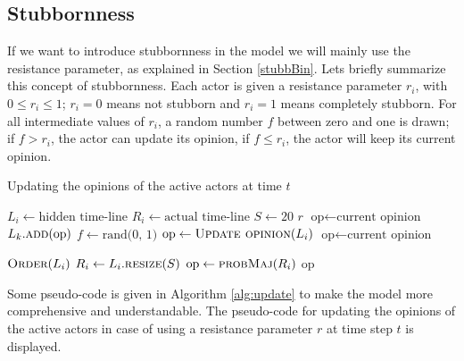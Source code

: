 \documentclass[11 pt , letterpaper , twoside , openright]{book}
\begin{document}
\subsection{Stubbornness}

If we want to introduce stubbornness in the model we will mainly use the resistance parameter, as explained in Section \ref{stubbBin}. Lets briefly summarize this concept of stubbornness. Each actor is given a resistance parameter $r_i$, with $0 \leqslant r_i \leqslant 1$; $r_i = 0$ means not stubborn and $r_i = 1$ means completely stubborn. For all intermediate values of $r_i$, a random number $f$ between zero and one is drawn; if $f > r_i$, the actor can update its opinion, if $f \leqslant r_i$, the actor will keep its current opinion. 

\begin{algorithm}
\caption{Updating the opinions of the active actors at time $t$}
\label{alg:update}
\begin{algorithmic}[1]
	\State \(L_i \leftarrow \text{hidden time-line}\)
	\State \(R_i \leftarrow \text{actual time-line}\)
	\State \(S \leftarrow 20\) 
	\State \(r\) 
		\State \(\text{op} \leftarrow \text{current opinion}\)
		 
			\State \(L_k.\textsc{add}\text{(op)}\)
		\EndFor
		\State \(f \leftarrow \text{rand(0, 1)}\) 
			\State \(\text{op} \leftarrow \Call{Update opinion}{L_i}\) 
		\Else
			\State \(\text{op} \leftarrow \text{current opinion}\) 
		\EndIf
	\EndFor
	
		\State \(\textsc{Order}(L_i)\) 
			\State \(R_i \leftarrow L_i.\textsc{resize}(S)\) 
		\EndIf
		\State \(\text{op} \leftarrow \textsc{probMaj}(R_i)\) 
	\State \Return op 
	\EndFunction
\end{algorithmic}
\end{algorithm}
\noindent
Some pseudo-code is given in Algorithm \ref{alg:update} to make the model more comprehensive and understandable. The pseudo-code for updating the opinions of the active actors in case of using a resistance parameter $r$ at time step $t$ is displayed. 
\end{document}
